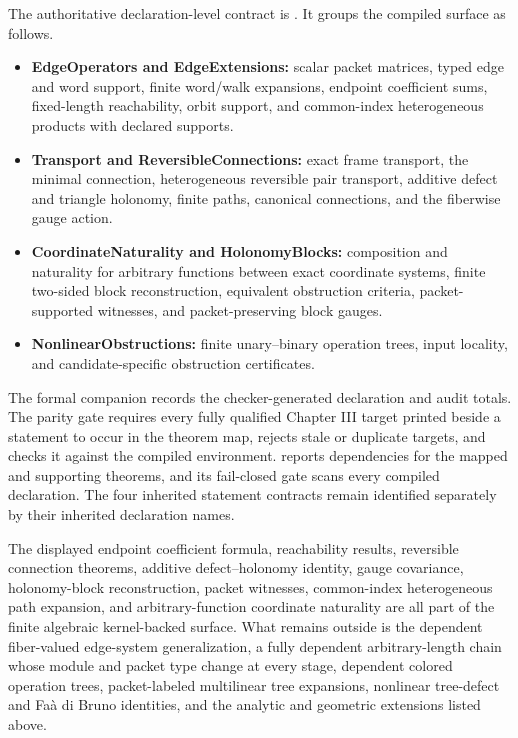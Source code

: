 The authoritative declaration-level contract is
.  It groups the compiled
surface as follows.
\begin{itemize}
\item \textbf{EdgeOperators and EdgeExtensions:} scalar packet matrices,
typed edge and word support, finite word/walk expansions, endpoint coefficient
sums, fixed-length reachability, orbit support, and common-index
heterogeneous products with declared supports.
\item \textbf{Transport and ReversibleConnections:} exact frame transport,
the minimal connection, heterogeneous reversible pair transport, additive
defect and triangle holonomy, finite paths, canonical connections, and the
fiberwise gauge action.
\item \textbf{CoordinateNaturality and HolonomyBlocks:} composition and
naturality for arbitrary functions between exact coordinate systems, finite
two-sided block reconstruction, equivalent obstruction criteria,
packet-supported witnesses, and packet-preserving block gauges.
\item \textbf{NonlinearObstructions:} finite unary--binary operation trees,
input locality, and candidate-specific obstruction certificates.
\end{itemize}
The formal companion records the checker-generated declaration
and audit totals.  The parity gate requires every fully qualified Chapter III
target printed beside a statement to occur in the theorem map, rejects stale
or duplicate targets, and checks it against the compiled environment.
 reports dependencies for the mapped and supporting
theorems, and its fail-closed gate scans every compiled
 declaration.  The four inherited statement
contracts remain identified separately by their inherited declaration names.

\begin{boundary}
The displayed endpoint coefficient formula, reachability results, reversible
connection theorems, additive defect--holonomy identity, gauge covariance,
holonomy-block reconstruction, packet witnesses, common-index heterogeneous
path expansion, and arbitrary-function coordinate naturality are all part of
the finite algebraic kernel-backed surface.  What remains outside is the
dependent fiber-valued edge-system generalization, a fully dependent
arbitrary-length chain whose module and packet type change at every stage,
dependent colored operation trees, packet-labeled multilinear tree
expansions, nonlinear tree-defect and Fa\`a di Bruno identities, and the
analytic and geometric extensions listed above.
\end{boundary}


